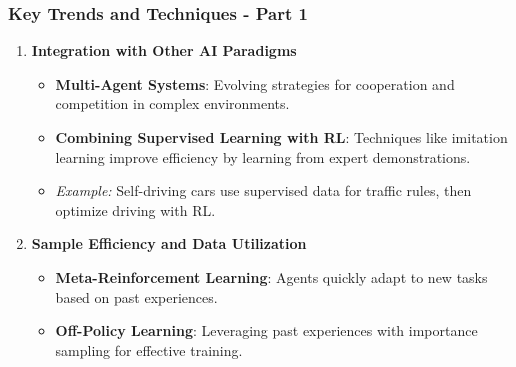 \documentclass[aspectratio=169]{beamer}
\begin{document}
\begin{frame}[fragile]
    \frametitle{Key Trends and Techniques - Part 1}
    \begin{enumerate}
        \item \textbf{Integration with Other AI Paradigms}
        \begin{itemize}
            \item \textbf{Multi-Agent Systems}: Evolving strategies for cooperation and competition in complex environments.
            \item \textbf{Combining Supervised Learning with RL}: Techniques like imitation learning improve efficiency by learning from expert demonstrations.
            \item \textit{Example:} Self-driving cars use supervised data for traffic rules, then optimize driving with RL.
        \end{itemize}

        \item \textbf{Sample Efficiency and Data Utilization}
        \begin{itemize}
            \item \textbf{Meta-Reinforcement Learning}: Agents quickly adapt to new tasks based on past experiences.
            \item \textbf{Off-Policy Learning}: Leveraging past experiences with importance sampling for effective training.
        \end{itemize}
    \end{enumerate}
\end{frame}
\end{document}
